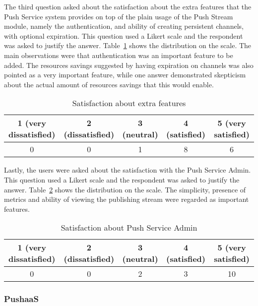 The third question asked about the satisfaction about the extra features that the Push Service system provides on top of the plain usage of the Push Stream module, namely the authentication, and ability of creating persistent channels, with optional expiration. This question used a Likert scale and the respondent was asked to justify the answer. Table~\ref{table:result-push-service-1} shows the distribution on the scale. The main observations were that authentication was an important feature to be added. The resources savings suggested by having expiration on channels was also pointed as a very important feature, while one answer demonstrated skepticism about the actual amount of resources savings that this would enable.

\begin{table}[h!]
    \centering
    \begin{tabular}{|c|c|c|c|c|}
        \hline
        1 (very dissatisfied) & 2 (dissatisfied) & 3 (neutral) & 4 (satisfied) & 5 (very satisfied) \\
        \hline
        0 & 0 & 1 & 8 & 6 \\
        \hline
    \end{tabular}
    \caption{Satisfaction about extra features}
    \label{table:result-push-service-1}
\end{table}

Lastly, the users were asked about the satisfaction with the Push Service Admin. This question used a Likert scale and the respondent was asked to justify the answer. Table~\ref{table:result-push-service-2} shows the distribution on the scale. The simplicity, presence of metrics and ability of viewing the publishing stream were regarded as important features.

\begin{table}[h!]
    \centering
    \begin{tabular}{|c|c|c|c|c|}
        \hline
        1 (very dissatisfied) & 2 (dissatisfied) & 3 (neutral) & 4 (satisfied) & 5 (very satisfied) \\
        \hline
        0 & 0 & 2 & 3 & 10 \\
        \hline
    \end{tabular}
    \caption{Satisfaction about Push Service Admin}
    \label{table:result-push-service-2}
\end{table}


\subsubsection{PushaaS}

